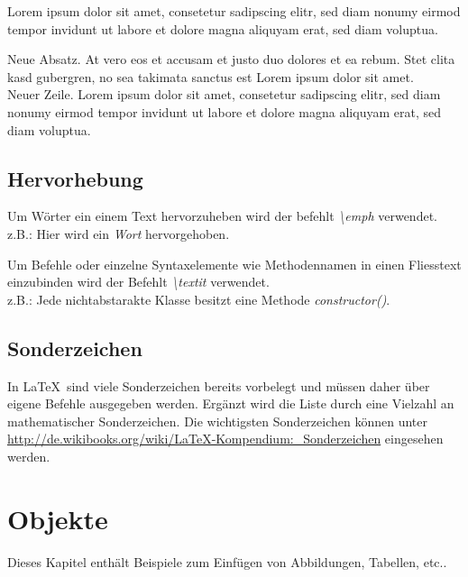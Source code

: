 		Lorem ipsum dolor sit amet, consetetur sadipscing elitr, sed diam nonumy eirmod tempor invidunt ut labore et dolore magna aliquyam erat, sed diam voluptua.

		Neue Absatz. At vero eos et accusam et justo duo dolores et ea rebum. Stet clita kasd gubergren, no sea takimata sanctus est Lorem ipsum dolor sit amet. \\ %
		Neuer Zeile. Lorem ipsum dolor sit amet, consetetur sadipscing elitr, sed diam nonumy eirmod tempor invidunt ut labore et dolore magna aliquyam erat, sed diam voluptua.

		\subsection{Hervorhebung}
		\label{ch:hervorhebung}
		Um Wörter ein einem Text hervorzuheben wird der befehlt \textit{\textbackslash emph} verwendet.
		\\ z.B.: Hier wird ein \emph{Wort} hervorgehoben.

		Um Befehle oder einzelne Syntaxelemente wie Methodennamen in einen Fliesstext einzubinden wird der Befehlt \textit{\textbackslash textit} verwendet.
		\\z.B.: Jede nichtabstarakte Klasse besitzt eine Methode \textit{constructor()}.

		\subsection{Sonderzeichen}
		\label{ch:zeichen}

		In \LaTeX \ sind viele Sonderzeichen bereits vorbelegt und müssen daher über eigene Befehle ausgegeben werden. Ergänzt wird die Liste durch eine Vielzahl an mathematischer Sonderzeichen. Die wichtigsten Sonderzeichen können unter \url{http://de.wikibooks.org/wiki/LaTeX-Kompendium:_Sonderzeichen} eingesehen werden.

		


		\pagebreak
		\section{Objekte}
		\label{ch:objekte}
		Dieses Kapitel enthält Beispiele zum Einfügen von Abbildungen, Tabellen, etc..

